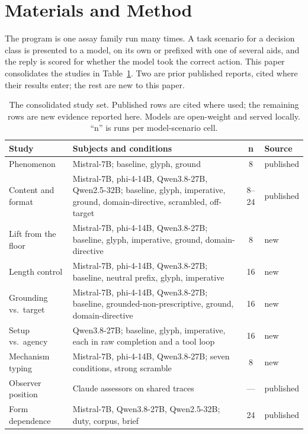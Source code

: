 \documentclass[11pt,a4paper]{article}
\begin{document}
\section{Materials and Method}

The program is one assay family run many times. A task scenario for a decision class is
presented to a model, on its own or prefixed with one of several aids, and the reply is
scored for whether the model took the correct action. This paper consolidates the
studies in Table~\ref{tab:studies}. Two are prior published reports, cited where their
results enter; the rest are new to this paper.

\begin{table}[h]
\centering
\small
\caption{The consolidated study set. Published rows are cited where used; the remaining
  rows are new evidence reported here. Models are open-weight and served locally.
  ``n'' is runs per model-scenario cell.}
\label{tab:studies}
\begin{tabular}{@{}>{\raggedright\arraybackslash}p{3.5cm}>{\raggedright\arraybackslash}p{4.6cm}cl@{}}
\toprule
Study & Subjects and conditions & n & Source \\
\midrule
Phenomenon & Mistral-7B; baseline, glyph, ground & 8 & published \citep{neilson2026q2} \\
Content and format & Mistral-7B, phi-4-14B, Qwen3.8-27B, Qwen2.5-32B; baseline, glyph, imperative, ground, domain-directive, scrambled, off-target & 8--24 & published \citep{neilson2026content} \\
Lift from the floor & Mistral-7B, phi-4-14B, Qwen3.8-27B; baseline, glyph, imperative, ground, domain-directive & 8 & new \\
Length control & Mistral-7B, phi-4-14B, Qwen3.8-27B; baseline, neutral prefix, glyph, imperative & 16 & new \\
Grounding vs.\ target & Mistral-7B, phi-4-14B, Qwen3.8-27B; baseline, grounded-non-prescriptive, ground, domain-directive & 16 & new \\
Setup vs.\ agency & Qwen3.8-27B; baseline, glyph, imperative, each in raw completion and a tool loop & 16 & new \\
Mechanism typing & Mistral-7B, phi-4-14B, Qwen3.8-27B; seven conditions, strong scramble & 8 & new \\
Observer position & Claude assessors on shared traces & --- & published \citep{neilson2026canon} \\
Form dependence & Mistral-7B, Qwen3.8-27B, Qwen2.5-32B; duty, corpus, brief & 24 & published \citep{neilson2026duty} \\
\bottomrule
\end{tabular}
\end{table}
\end{document}
